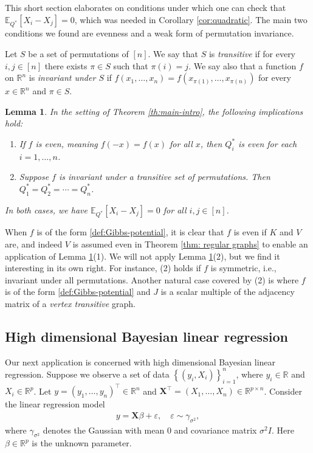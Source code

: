 \documentclass[11pt,reqno]{amsart}
\numberwithin{equation}{section}
\newtheorem{lemma}[theorem]{Lemma}
\theoremstyle{definition}
\def\E{{\mathbb E}}
\def\R{{\mathbb R}}
\begin{document}
	This short section elaborates on conditions under which one can check that $\E_{Q^*}[X_i-X_j]=0$, which was needed in Corollary \ref{cor:quadratic}. The main two conditions we found are evenness and a weak form of permutation invariance. 
	
	\begin{definition}
		Let $S$ be a set of permutations of $[n]$. We say that $S$ is \emph{transitive} if for every $i,j \in [n]$ there exists $\pi \in S$ such that $\pi(i)=j$. We say also that a function $f$ on $\R^n$ is \emph{invariant under $S$} if $f(x_1,\ldots,x_n)=f(x_{\pi(1)},\ldots,x_{\pi(n)})$ for every $x \in \R^n$ and $\pi \in S$.
	\end{definition}
	
	\begin{lemma} \label{le:evenness}
		In the setting of Theorem \ref{th:main-intro}, the following implications hold:
		\begin{enumerate}[(1)]
			\item If $f$ is even, meaning $f(-x)=f(x)$ for all $x$, then $Q^*_i$ is even for each $i=1,\ldots,n$.
		
			\item Suppose $f$ is invariant under a transitive set of permutations. Then $Q^*_1=Q^*_2=\cdots=Q^*_n$. 
		\end{enumerate}
		In both cases, we  have $\E_{Q^*}[X_i-X_j]=0$ for all $i,j \in [n]$.
	\end{lemma}
	
	
	
	When $f$ is of the form \eqref{def:Gibbs-potential}, it is clear that $f$ is even if $K$ and $V$ are, and indeed $V$ is assumed even in Theorem \ref{thm: regular graphs} to enable an application of Lemma \ref{le:evenness}(1).
	We will not apply Lemma \ref{le:evenness}(2), but we find it interesting in its own right. For instance, (2) holds if $f$ is symmetric, i.e., invariant under all permutations. Another natural case covered by (2) is where $f$ is of the form \eqref{def:Gibbs-potential} and $J$ is a scalar multiple of the adjacency matrix of a \emph{vertex transitive} graph.


\subsection{High dimensional Bayesian linear regression}
Our next application is concerned with high dimensional Bayesian linear regression. Suppose we observe a set of data $ \left\{(y_i, X_i)\right\}_{i=1}^n $, where $ y_i \in \R $ and $ X_i \in \R^p $. Let $ y =  (y_1, \dots, y_n)^\top \in \R^n$ and $ \mathbf{X}^\top = (X_1, \dots, X_n) \in \R^{p \times n}$. Consider the linear regression model 
\begin{align*}
	y = \mathbf{X} \beta + \varepsilon, \quad \varepsilon \sim \gamma_{\sigma^2},
\end{align*}
where $ \gamma_{\sigma^2} $ denotes the Gaussian with mean $0$ and covariance matrix $\sigma^2I$. Here $\beta \in \R^p$ is the unknown parameter.
\end{document}
